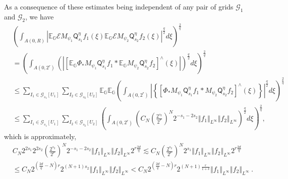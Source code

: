\documentclass{amsart}%
\theoremstyle{plain}
\numberwithin{equation}{section}
\begin{document}
As a consequence of these estimates being independent of any pair of grids
$\mathcal{G}_{1}$ and $\mathcal{G}_{2}$, we have%
\begin{align*}
& \left(  \int_{A\left(  0,R\right)  }\left\vert \mathbb{E}_{\mathbb{G}%
}\mathcal{E}M_{\psi_{1}}\mathsf{Q}_{s_{1}}^{\eta}f_{1}\left(  \xi\right)
\mathbb{E}_{\mathbb{G}}\mathcal{E}M_{\psi_{2}}\mathsf{Q}_{s_{2}}^{\eta}%
f_{2}\left(  \xi\right)  \right\vert ^{\frac{q}{2}}d\xi\right)  ^{\frac{2}{q}%
}\\
& =\left(  \int_{A\left(  0,2^{r}\right)  }\left(  \left\vert \left[
\mathbb{E}_{\mathbb{G}}\Phi_{\ast}M_{\psi_{1}}\mathsf{Q}_{s_{1}}^{\eta}%
f_{1}\ast\mathbb{E}_{\mathbb{G}}M_{\psi_{2}}\mathsf{Q}_{s_{2}}^{\eta}%
f_{2}\right]  ^{\wedge}\left(  \xi\right)  \right\vert \right)  ^{\frac{q}{2}%
}d\xi\right)  ^{\frac{2}{q}}\\
& \leq\sum_{I_{1}\in\mathcal{G}_{s_{1}}\left[  U_{1}\right]  }\sum_{I_{2}%
\in\mathcal{G}_{s_{2}}\left[  U_{2}\right]  }\mathbb{E}_{\mathbb{G}}%
\mathbb{E}_{\mathbb{G}}\left(  \int_{A\left(  0,2^{r}\right)  }\left\vert
\left\{  \left[  \Phi_{\ast}M_{\psi_{1}}\mathsf{Q}_{s_{1}}^{\eta}f_{1}\ast
M_{\psi_{2}}\mathsf{Q}_{s_{2}}^{\eta}f_{2}\right]  ^{\wedge}\left(
\xi\right)  \right\}  \right\vert ^{\frac{q}{2}}d\xi\right)  ^{\frac{2}{q}}\\
& \leq\sum_{I_{1}\in\mathcal{G}_{s_{1}}\left[  U_{1}\right]  }\sum_{I_{2}%
\in\mathcal{G}_{s_{2}}\left[  U_{2}\right]  }\left(  \int_{A\left(
0,2^{r}\right)  }\left(  C_{N}\left(  \frac{2^{s_{2}}}{2^{r}}\right)
^{N}2^{-s_{1}-2s_{2}}\left\Vert f_{1}\right\Vert _{L^{\infty}}\left\Vert
f_{2}\right\Vert _{L^{\infty}}\right)  ^{\frac{q}{2}}d\xi\right)  ^{\frac
{2}{q}},
\end{align*}
which is approximately,%
\begin{align*}
& C_{N}2^{2s_{1}}2^{2s_{2}}\left(  \frac{2^{s_{2}}}{2^{r}}\right)
^{N}2^{-s_{1}-2s_{2}}\left\Vert f_{1}\right\Vert _{L^{\infty}}\left\Vert
f_{2}\right\Vert _{L^{\infty}}2^{r\frac{2d}{q}}\lesssim C_{N}\left(
\frac{2^{s_{2}}}{2^{r}}\right)  ^{N}2^{s_{1}}\left\Vert f_{1}\right\Vert
_{L^{\infty}}\left\Vert f_{2}\right\Vert _{L^{\infty}}2^{r\frac{2d}{q}}\\
& \leq C_{N}2^{\left(  \frac{2d}{q}-N\right)  r}2^{\left(  N+1\right)  s_{2}%
}\left\Vert f_{1}\right\Vert _{L^{\infty}}\left\Vert f_{2}\right\Vert
_{L^{\infty}}<C_{N}2^{\left(  \frac{2d}{q}-N\right)  r}2^{\left(  N+1\right)
\frac{r}{1+\delta}}\left\Vert f_{1}\right\Vert _{L^{\infty}}\left\Vert
f_{2}\right\Vert _{L^{\infty}}\ .
\end{align*}
\end{document}
